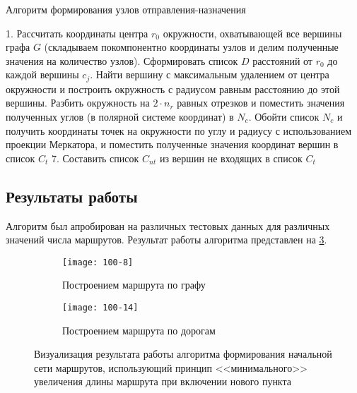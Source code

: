 \begin{algorithm}[ht!]
    \caption{Алгоритм формирования узлов отправления-назначения}
    1. Рассчитать координаты центра \( r_0 \) окружности, охватывающей все вершины графа \( G \) (складываем 
        покомпонентно координаты узлов и делим полученные значения на количество узлов). Сформировать список \( D \) расстояний от \( r_0 \) до каждой вершины \( c_j \). Найти вершину с максимальным удалением от центра окружности и построить окружность с радиусом 
        равным расстоянию до этой вершины. Разбить окружность на \( 2\cdot n_r \) равных отрезков и поместить значения полученных 
        углов (в полярной системе координат) в \( N_c \). Обойти список \( N_c \) и получить координаты точек на окружности по углу и радиусу с 
        использованием проекции Меркатора, и поместить полученные значения координат вершин в 
        список \( C_t \)\;
    7. Составить список \( C_{nt} \) из вершин не входящих в список \( C_t \)\;
    \label{alg:convex-hull}
\end{algorithm}

\subsection{Результаты работы}
Алгоритм был апробирован на различных тестовых данных для различных значений числа маршрутов. Результат 
работы алгоритма представлен на \ref{img:min-length-01}.
\begin{figure}[h!]
    \centering
    \begin{subfigure}{0.75\textwidth}
        \texttt{[image: 100-8]}
        \caption{Построением маршрута по графу}
        \label{fig:graph}
    \end{subfigure}
    \begin{subfigure}{0.75\textwidth}
        \texttt{[image: 100-14]}
        \caption{Построением маршрута по дорогам}
        \label{fig:osrm}
    \end{subfigure}
    \caption{Визуализация результата работы алгоритма формирования начальной сети маршрутов, 
        использующий принцип <<минимального>> увеличения длины маршрута при включении нового пункта%
    }
   \label{img:min-length-01}
\end{figure}

